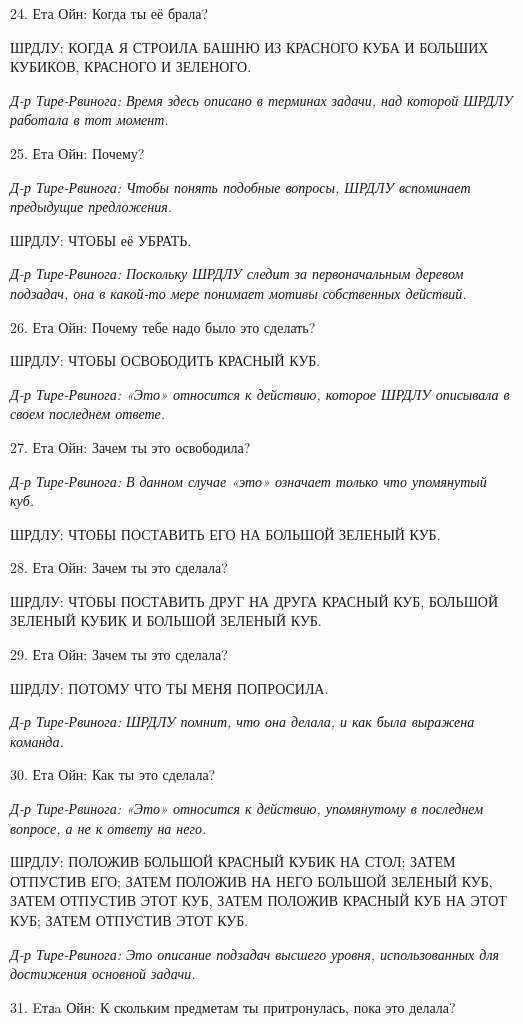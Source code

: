 \documentclass[../main.tex]{subfiles}
\begin{document}
\begin{dialogue}
24. Ета Ойн: Когда ты её брала?

ШРДЛУ: КОГДА Я СТРОИЛА БАШНЮ ИЗ КРАСНОГО КУБА И БОЛЬШИХ КУБИКОВ, КРАСНОГО И ЗЕЛЕНОГО.

\emph{Д-р Тире-Рвинога: Время здесь описано в терминах задачи, над которой ШРДЛУ работала в тот момент.}

25. Ета Ойн: Почему?

\emph{Д-р Тире-Рвинога: Чтобы понять подобные вопросы, ШРДЛУ вспоминает предыдущие предложения.}

ШРДЛУ: ЧТОБЫ её УБРАТЬ.

\emph{Д-р Тире-Рвинога: Поскольку ШРДЛУ следит за первоначальным деревом подзадач, она в какой-то мере понимает мотивы собственных действий.}

26. Ета Ойн: Почему тебе надо было это сделать?

ШРДЛУ: ЧТОБЫ ОСВОБОДИТЬ КРАСНЫЙ КУБ.

\emph{Д-р Тире-Рвинога: «Это» относится к действию, которое ШРДЛУ описывала в своем последнем ответе.}

27. Ета Ойн: Зачем ты это освободила?

\emph{Д-р Тире-Рвинога: В данном случае «это» означает только что упомянутый куб.}

ШРДЛУ: ЧТОБЫ ПОСТАВИТЬ ЕГО НА БОЛЬШОЙ ЗЕЛЕНЫЙ КУБ.

28. Ета Ойн: Зачем ты это сделала?

ШРДЛУ: ЧТОБЫ ПОСТАВИТЬ ДРУГ НА ДРУГА КРАСНЫЙ КУБ, БОЛЬШОЙ ЗЕЛЕНЫЙ КУБИК И БОЛЬШОЙ ЗЕЛЕНЫЙ КУБ.

29. Ета Ойн: Зачем ты это сделала?

ШРДЛУ: ПОТОМУ ЧТО ТЫ МЕНЯ ПОПРОСИЛА.

\emph{Д-р Тире-Рвинога: ШРДЛУ помнит, что она делала, и как была выражена команда.}

30. Ета Ойн: Как ты это сделала?

\emph{Д-р Тире-Рвинога: «Это» относится к действию, упомянутому в последнем вопросе, а не к ответу на него.}

ШРДЛУ: ПОЛОЖИВ БОЛЬШОЙ КРАСНЫЙ КУБИК НА СТОЛ; ЗАТЕМ ОТПУСТИВ ЕГО; ЗАТЕМ ПОЛОЖИВ НА НЕГО БОЛЬШОЙ ЗЕЛЕНЫЙ КУБ, ЗАТЕМ ОТПУСТИВ ЭТОТ КУБ, ЗАТЕМ ПОЛОЖИВ КРАСНЫЙ КУБ НА ЭТОТ КУБ; ЗАТЕМ ОТПУСТИВ ЭТОТ КУБ.

\emph{Д-р Тире-Рвинога: Это описание подзадач высшего уровня, использованных для достижения основной задачи.}

31. Eтаa Ойн: К скольким предметам ты притронулась, пока это делала?


\end{dialogue}
\end{document}
